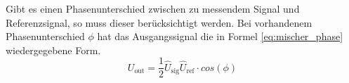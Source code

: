 Gibt es einen Phasenunterschied zwischen zu messendem Signal und
Referenzsignal, so muss dieser berücksichtigt werden. Bei vorhandenem
Phasenunterschied $\phi$ hat das Ausgangssignal die in Formel
\eqref{eq:mischer_phase} wiedergegebene Form.
%
\begin{equation}
  \label{eq:mischer_phase}
   U_\text{out} = \frac{1}{2} \widehat{U}_\text{sig}
   \widehat{U}_\text{ref} \cdot cos(\phi)
\end{equation}

